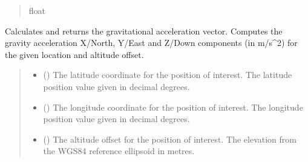 \documentclass[letterpaper,10pt,english]{sphinxmanual}
\begin{document}
\begin{fulllineitems}
\begin{fulllineitems}
\begin{quote}
\begin{description}
\sphinxAtStartPar
float

\end{description}\end{quote}

\end{fulllineitems}


\begin{fulllineitems}
\label{\detokenize{modules/gravity/base:qnav.gravity.base.GravityModel.calc_gravity_xyz}}
\pysigstartsignatures
{}
\pysigstopsignatures
\sphinxAtStartPar
Calculates and returns the gravitational acceleration vector.
Computes the gravity acceleration X/North, Y/East and Z/Down
components (in m/s\textasciicircum{}2) for the given location and altitude offset.
\begin{quote}\begin{description}
\begin{itemize}
\item {} 
\sphinxAtStartPar
{} () \textendash{} The latitude coordinate for the position of interest.
The latitude position value given in decimal degrees.

\item {} 
\sphinxAtStartPar
{} () \textendash{} The longitude coordinate for the position of interest.
The longitude position value given in decimal degrees.

\item {} 
\sphinxAtStartPar
{} () \textendash{} The altitude offset for the position of interest.
The elevation from the WGS\sphinxhyphen{}84 reference ellipsoid in metres.

\end{itemize}


\end{description}
\end{quote}
\end{fulllineitems}
\end{fulllineitems}
\end{document}
